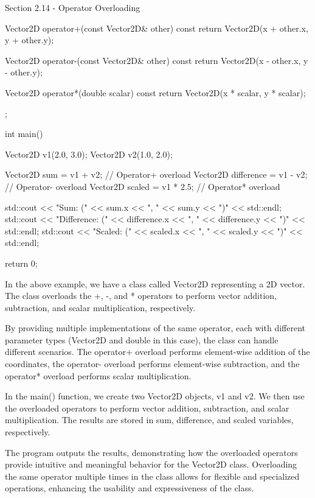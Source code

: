 \begin{notes}{Section 2.14 - Operator Overloading}
\begin{highlight}
\begin{code}[C++]
{        Vector2D operator+(const Vector2D& other) const {
            return Vector2D(x + other.x, y + other.y);
        }
    
        Vector2D operator-(const Vector2D& other) const {
            return Vector2D(x - other.x, y - other.y);
        }
    
        Vector2D operator*(double scalar) const {
            return Vector2D(x * scalar, y * scalar);
        }
    };
    
    int main() {
        Vector2D v1(2.0, 3.0);
        Vector2D v2(1.0, 2.0);
    
        Vector2D sum = v1 + v2;           // Operator+ overload
        Vector2D difference = v1 - v2;     // Operator- overload
        Vector2D scaled = v1 * 2.5;        // Operator* overload
    
        std::cout << "Sum: (" << sum.x << ", " << sum.y << ")" << std::endl;
        std::cout << "Difference: (" << difference.x << ", " << difference.y << ")" 
        << std::endl;
        std::cout << "Scaled: (" << scaled.x << ", " << scaled.y << ")" 
        << std::endl;
    
        return 0;
    }
    \end{code}
        In the above example, we have a class called Vector2D representing a 2D vector. The class overloads the +, -, and * operators to perform vector addition, subtraction, and scalar multiplication, respectively.
    
        By providing multiple implementations of the same operator, each with different parameter types (Vector2D and double in this case), the class can handle different scenarios. The operator+ overload performs element-wise addition of the coordinates, the operator- overload performs element-wise subtraction, 
        and the operator* overload performs scalar multiplication.
    
        In the main() function, we create two Vector2D objects, v1 and v2. We then use the overloaded operators to perform vector addition, subtraction, and scalar multiplication. The results are stored in sum, difference, and scaled variables, respectively.
    
        The program outputs the results, demonstrating how the overloaded operators provide intuitive and meaningful behavior for the Vector2D class. Overloading the same operator multiple times in the class allows for flexible and specialized operations, enhancing the usability and expressiveness of the class.
    \end{highlight}
\end{notes}

